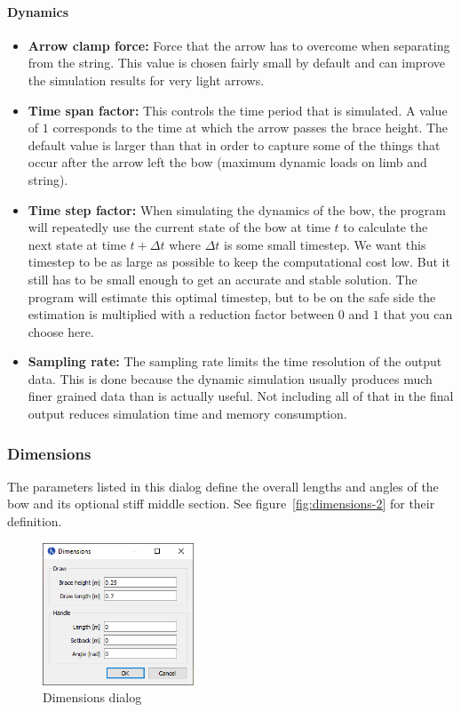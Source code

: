 \documentclass[12pt]{article}
\begin{document}
\paragraph*{Dynamics}

\begin{itemize}
\item \textbf{Arrow clamp force:} Force that the arrow has to overcome when separating from the string.
This value is chosen fairly small by default and can improve the simulation results for very light arrows.
\item \textbf{Time span factor:} This controls the time period that is simulated. A value of $1$ corresponds to the time at which the arrow passes the brace height. The default value is larger than that in order to capture some of the things that occur after the arrow left the bow (maximum dynamic loads on limb and string).
\item \textbf{Time step factor:} When simulating the dynamics of the bow, the program will repeatedly use the current state of the bow at time $t$ to calculate the next state at time $t + \Delta t$ where $\Delta t$ is some small timestep. We want this timestep to be as large as possible to keep the computational cost low. But it still has to be small enough to get an accurate and stable solution. The program will estimate this optimal timestep, but to be on the safe side the estimation is multiplied with a reduction factor between $0$ and $1$ that you can choose here.
\item \textbf{Sampling rate:} The sampling rate limits the time resolution of the output data. This is done because the dynamic simulation usually produces much finer grained data than is actually useful. Not including all of that in the final output reduces simulation time and memory consumption.
\end{itemize}

\newpage
\subsubsection{Dimensions}
\label{sec:dimensions}

The parameters listed in this dialog define the overall lengths and angles of the bow and its optional stiff middle section. See figure~\ref{fig:dimensions-2} for their definition.
\bigskip

\begin{figure}[H]
\centering
\includegraphics[width=0.4\textwidth]{figures/screenshots/input/dimensions}
\caption{Dimensions dialog}
\label{fig:dimensions-1}
\end{figure}
\end{document}
